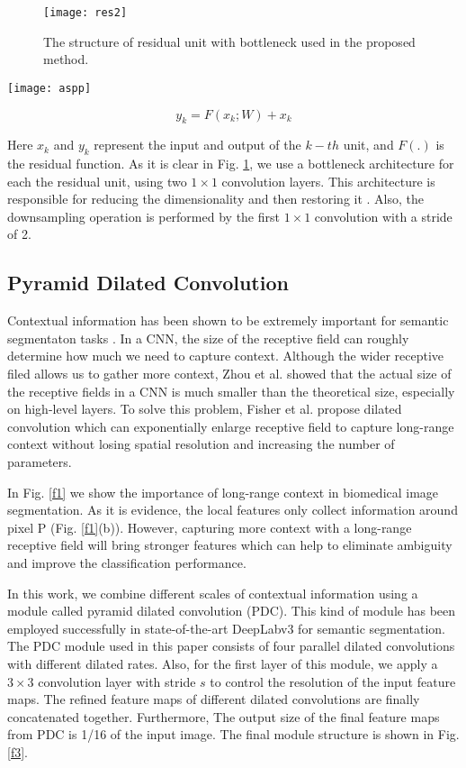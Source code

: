 \documentclass[10pt,twocolumn]{article}
\begin{document}
\begin{figure}[t]
\centering
\texttt{[image: res2]}
\caption{The structure of residual unit with bottleneck used in the proposed method.} 
\label{f2}
\end{figure}

\begin{figure*}[h]
\centering
\texttt{[image: aspp]}
\caption{Pyramid Dilated Convolution (PDC) module structure.}  \label{f3}
\end{figure*}

\begin{equation} 
  y_{k}=F(x_{k};W)+x_{k}
\end{equation}

Here $x_{k}$ and $y_{k}$ represent the input and output of the $k-th$ unit, and $F(.)$ is the residual function.
As it is clear in Fig. \ref{f2}, we use a bottleneck architecture for each the residual unit, using two $1\times1$  convolution layers. This architecture is responsible for reducing the dimensionality and then restoring it \cite{r9}. 
Also, the downsampling operation is performed by the first $1\times1$ convolution with a stride of 2.

\subsection{Pyramid Dilated Convolution}
\label{s32}
Contextual information has been shown to be extremely important for semantic segmentaton tasks \cite{r12,r13}.
In a CNN, the size of the receptive field can roughly determine how much we need to capture context. Although the wider receptive filed allows us to gather more context, Zhou et al. \cite{r15} showed that the actual size of the receptive fields in a CNN is much smaller than the theoretical size, especially on high-level layers.
To solve this problem, Fisher et al. \cite{r16} propose dilated convolution which can exponentially enlarge receptive field to capture long-range context without losing spatial resolution and increasing the number of parameters.

In Fig. \ref{f1} we show the importance of long-range context in biomedical image segmentation. As it is evidence, the local features only collect information around pixel P (Fig. \ref{f1}(b)). However, capturing more context with a long-range receptive field will bring stronger features which can help to eliminate ambiguity and improve the classification performance.

In this work, we combine different scales of contextual information using a module called pyramid dilated convolution (PDC). This kind of module has been employed successfully in state-of-the-art DeepLabv3 \cite{r10} for semantic segmentation. The PDC module used in this paper consists of four parallel dilated convolutions with different dilated rates. Also, for the first layer of this module, we apply a $3\times3$ convolution layer with stride $s$ to control the resolution of the input feature maps. The refined feature maps of different dilated convolutions are finally concatenated together. Furthermore, The output size of the final feature maps from PDC is 1/16 of the input image. The final module structure is shown in Fig. \ref{f3}.
\end{document}
